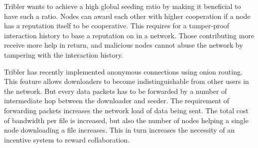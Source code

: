 Tribler wants to achieve a high global seeding ratio by making it beneficial to have such a ratio.
Nodes can award each other with higher cooperation if a node has a reputation itself to be cooperative.
This requires for a tamper-proof interaction history to base a reputation on in a network.
Those contributing more receive more help in return,
and malicious nodes cannot abuse the network by tampering with the interaction history.

Tribler has recently implemented anonymous connections using onion routing.
This feature allows downloaders to become indistinguishable from other users in the network.
But every data packets has to be forwarded
by a number of intermediate hop between the downloader and seeder\cite{Plak-anonymous}.
The requirement of forwarding packets increases the network load of data being sent.
The total cost of bandwidth per file is increased,
but also the number of nodes helping a single node downloading a file increases.
This in turn increases the necessity of an incentive system to reward collaboration.

